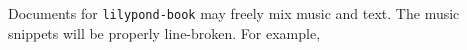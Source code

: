 \documentclass[a4paper]{article}
\begin{document}
Documents for \verb+lilypond-book+ may freely mix music and text. The music
snippets will be properly line-broken. For example,

{%
\parindent 0pt
\noindent
\ifx\preLilyPondExample \undefined
\else
  \expandafter\preLilyPondExample
\fi
\def\lilypondbook{}%

\ifx\postLilyPondExample \undefined
\else
  \expandafter\postLilyPondExample
\fi
}
\end{document}

